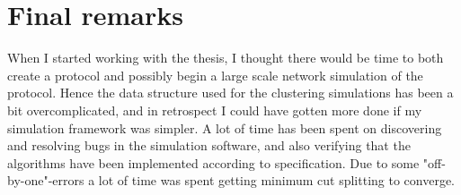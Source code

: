\section{Final remarks}
When I started working with the thesis, I thought there would be time to both create a protocol and possibly begin a large scale network simulation of the protocol.
Hence the data structure used for the clustering simulations has been a bit overcomplicated, and in retrospect I could have gotten more done if my simulation framework was simpler. 
A lot of time has been spent on discovering and resolving bugs in the simulation software, and also verifying that the algorithms have been implemented according to specification. 
Due to some "off-by-one"-errors a lot of time was spent getting minimum cut splitting to converge. 


